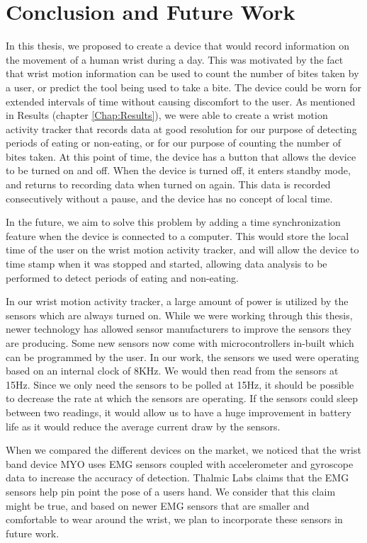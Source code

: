 \chapter{Conclusion and Future Work}
\label{Chap:Concl}
In this thesis, we proposed to create a device that would record information on 
the movement of a human wrist during a day.
This was motivated by the fact that wrist motion information can be used to count the number of bites
taken by a user,
or predict the tool being used to take a bite.
The device could be worn for extended intervals of time
without causing discomfort to the user.
As mentioned in Results (chapter \ref{Chap:Results}),
we were able to create a wrist motion activity tracker that records data at good resolution
for our purpose of detecting periods of eating or non-eating, 
or for our purpose of counting the number of bites taken.
At this point of time,
the device has a button that allows the device to be turned on and off.
When the device is turned off,
it enters standby mode,
and returns to recording data when turned on again.
This data is recorded consecutively without a pause,
and the device has no concept of local time.

In the future,
we aim to solve this problem by adding a time synchronization feature when the device is connected to a computer.
This would store the local time of the user on the wrist motion activity tracker,
and will allow the device to time stamp when it was stopped and started,
allowing data analysis to be performed to detect periods of eating and non-eating.

In our wrist motion activity tracker,
a large amount of power is utilized by the sensors which are always turned on.
While we were working through this thesis,
newer technology has allowed sensor manufacturers to improve the sensors they are producing.
Some new sensors now come with microcontrollers in-built which can be programmed by the user.
In our work,
the sensors we used
were operating based on an internal clock of 8KHz.
We would then read from the sensors at 15Hz.
Since we only need the sensors to be polled at 15Hz,
it should be possible to decrease the rate at which the sensors are operating.
If the sensors could sleep between two readings,
it would allow us to have a huge improvement in battery life as it would reduce the average current draw by the sensors.

When we compared the different devices on the market,
we noticed that the wrist band device MYO uses EMG sensors coupled with accelerometer and gyroscope data to increase the accuracy of detection.
Thalmic Labs \cite{Web:GetMyo} claims that the EMG sensors help pin point the pose of a users hand.
We consider that this claim might be true,
and based on newer EMG sensors that are smaller and comfortable to wear around the wrist,
we plan to incorporate these sensors in future work.